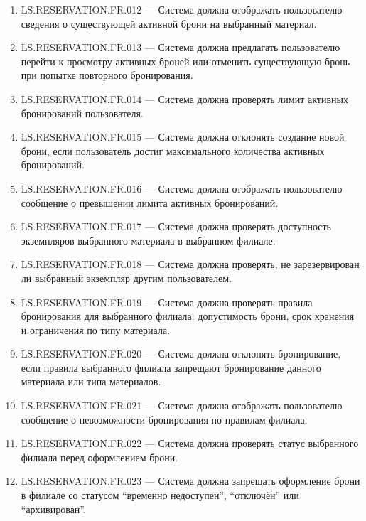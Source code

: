 \documentclass[12pt,a4paper]{article}
\begin{document}
\begin{enumerate}
		\item LS.RESERVATION.FR.012 --- Система должна отображать пользователю сведения
		о существующей активной брони на выбранный материал.
		
		\item LS.RESERVATION.FR.013 --- Система должна предлагать пользователю перейти
		к просмотру активных броней или отменить существующую бронь при попытке
		повторного бронирования.
		
		\item LS.RESERVATION.FR.014 --- Система должна проверять лимит активных
		бронирований пользователя.
		
		\item LS.RESERVATION.FR.015 --- Система должна отклонять создание новой брони,
		если пользователь достиг максимального количества активных бронирований.
		
		\item LS.RESERVATION.FR.016 --- Система должна отображать пользователю
		сообщение о превышении лимита активных бронирований.
		
		\item LS.RESERVATION.FR.017 --- Система должна проверять доступность экземпляров
		выбранного материала в выбранном филиале.
		
		\item LS.RESERVATION.FR.018 --- Система должна проверять, не зарезервирован ли
		выбранный экземпляр другим пользователем.
		
		\item LS.RESERVATION.FR.019 --- Система должна проверять правила бронирования
		для выбранного филиала: допустимость брони, срок хранения и ограничения по
		типу материала.
		
		\item LS.RESERVATION.FR.020 --- Система должна отклонять бронирование, если
		правила выбранного филиала запрещают бронирование данного материала или типа
		материалов.
		
		\item LS.RESERVATION.FR.021 --- Система должна отображать пользователю
		сообщение о невозможности бронирования по правилам филиала.
		
		\item LS.RESERVATION.FR.022 --- Система должна проверять статус выбранного
		филиала перед оформлением брони.
		
		\item LS.RESERVATION.FR.023 --- Система должна запрещать оформление брони в
		филиале со статусом ``временно недоступен'', ``отключён'' или ``архивирован''.
		

\end{enumerate}
\end{document}
